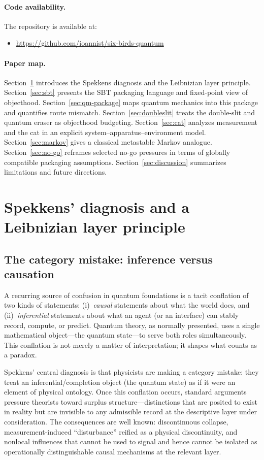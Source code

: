 \documentclass[11pt]{article}
\begin{document}
\paragraph{Code availability.}
The repository is available at:
\begin{itemize}
  \item \url{https://github.com/ioannist/six-birds-quantum}
\end{itemize}

\paragraph{Paper map.}
Section~\ref{sec:spekkens} introduces the Spekkens diagnosis and the Leibnizian layer principle. Section~\ref{sec:sbt} presents the SBT packaging language and fixed-point view of objecthood. Section~\ref{sec:qm-package} maps quantum mechanics into this package and quantifies route mismatch. Section~\ref{sec:doubleslit} treats the double-slit and quantum eraser as objecthood budgeting. Section~\ref{sec:cat} analyzes measurement and the cat in an explicit system--apparatus--environment model. Section~\ref{sec:markov} gives a classical metastable Markov analogue. Section~\ref{sec:no-go} reframes selected no-go pressures in terms of globally compatible packaging assumptions. Section~\ref{sec:discussion} summarizes limitations and future directions.
 \section{Spekkens' diagnosis and a Leibnizian layer principle}\label{sec:spekkens}

\subsection{The category mistake: inference versus causation}

A recurring source of confusion in quantum foundations is a tacit conflation of two kinds of statements:
(i)~\emph{causal} statements about what the world does, and
(ii)~\emph{inferential} statements about what an agent (or an interface) can stably record, compute, or predict.
Quantum theory, as normally presented, uses a single mathematical object---the quantum state---to serve both roles simultaneously. This conflation is not merely a matter of interpretation; it shapes what counts as a paradox.

Spekkens' central diagnosis is that physicists are making a category mistake: they treat an inferential/completion object (the quantum state) as if it were an element of physical ontology.\cite{Spekkens2007Toy} Once this conflation occurs, standard arguments pressure theorists toward surplus structure---distinctions that are posited to exist in reality but are invisible to any admissible record at the descriptive layer under consideration. The consequences are well known: discontinuous collapse, measurement-induced ``disturbance'' reified as a physical discontinuity, and nonlocal influences that cannot be used to signal and hence cannot be isolated as operationally distinguishable causal mechanisms at the relevant layer.
\end{document}
